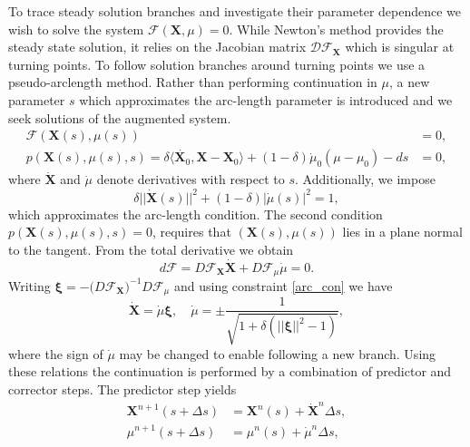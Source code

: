 \documentclass[a4paper]{article}
\begin{document}
To trace steady solution branches and investigate their parameter dependence we wish to solve the system $ \boldsymbol{\mathcal{F}}(\boldsymbol{X}, \mu ) = 0 $. While Newton's method provides the steady state solution, it relies on the Jacobian matrix $\mathcal{D F}_{\boldsymbol{X}}$ which is singular at turning points. To follow solution branches around turning points we use a pseudo-arclength method. Rather than performing continuation in $\mu$, a new parameter $s$ which approximates the arc-length parameter is introduced and we seek solutions of the augmented system.
\begin{equation}
\begin{aligned}
\boldsymbol{\mathcal{F}}(\boldsymbol{X}(s), \mu(s) ) & = 0, \\
p(\boldsymbol{X}(s), \mu(s),s) = \delta \langle \dot{\boldsymbol{X}_0} , \boldsymbol{X} - \boldsymbol{X}_0 \rangle +  (1-\delta)\dot{\mu}_0 ( \mu -\mu_0 ) - ds  & = 0 ,
\end{aligned}
\end{equation}
where $\dot{\boldsymbol{X}}$ and $\dot{\mu}$ denote derivatives with respect to $s$. Additionally, we impose
\begin{equation}
\delta || \dot{\boldsymbol{X}}(s) ||^2 + (1-\delta)|\dot{\mu}(s)|^2 = 1,
\label{arc_con}
\end{equation}
which approximates the arc-length condition. The second condition $p(\boldsymbol{X}(s),\mu(s),s) = 0$, requires that $(\boldsymbol{X}(s),\mu(s))$ lies in a plane normal to the tangent. From the total derivative we obtain
\begin{equation}
d \boldsymbol{\mathcal{F}} = D \mathcal{F}_{\boldsymbol{X}} \dot{\boldsymbol{X}} + D\boldsymbol{\mathcal{F}}_{\mu} \dot{\mu} = 0.
\end{equation}
Writing $\boldsymbol{\xi} = - \big( D \mathcal{F}_{\boldsymbol{X}} \big)^{-1} D\boldsymbol{\mathcal{F}}_{\mu}$ and using constraint \eqref{arc_con} we have
\begin{equation}
\dot{\boldsymbol{X}}= \dot{\mu} \boldsymbol{\xi}, \quad \dot{\mu} = \pm \frac{1}{\sqrt{1+\delta( ||\boldsymbol{\xi}||^2-1) }},
\end{equation}
where the sign of $\dot{\mu}$ may be changed to enable following a new branch. Using these relations the continuation is performed by a combination of predictor and corrector steps. The predictor step yields
\begin{equation}
\begin{aligned}
\boldsymbol{X}^{n+1}(s + \Delta s) &= \boldsymbol{X}^n(s) + \dot{\boldsymbol{X}}^n\Delta s, \\
\mu^{n+1}(s + \Delta s) &= \mu^n(s) + \dot{\mu}^n \Delta s, 
\end{aligned}
\end{equation}
\end{document}
